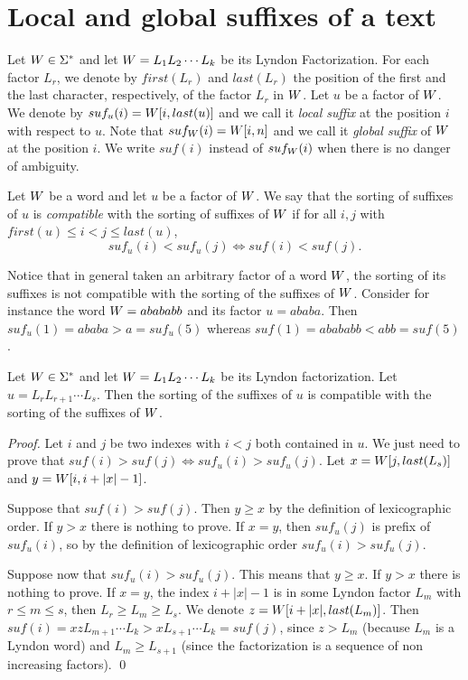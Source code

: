 \documentclass[envcountsame,runningheads]{llncs}
\begin{document}
\section{Local and global suffixes of a text}\label{sec:method}

Let $W \in \Sigma^*$ and let $W =L_1L_2 \cdots L_k$ be its Lyndon Factorization.
For each factor $L_r$, we denote by $first(L_r)$ and $last(L_r)$ the position of the first and the last character, respectively, of the factor $L_r$ in $W$. Let $u$ be a factor of $W$. We denote by $suf_u(i) = W[i, last(u)]$ and we call it \emph{local suffix} at the position $i$ with respect to $u$. Note that $suf_W(i) = W[i, n]$ and we call it \emph{global suffix} of $W$ at the position $i$. We write $suf(i)$ instead of $suf_W(i)$ when there is no danger of ambiguity.

\begin{definition}
Let $W$ be a word and let $u$ be a factor of $W$. We say that the sorting of suffixes of $u$ is \emph{compatible} with the sorting of suffixes of $W$ if for all $i,j$ with $first(u) \leq i < j \leq last(u)$,
$$suf_u(i) < suf_u(j) \iff suf(i) < suf(j).$$
\end{definition}

Notice that in general taken an arbitrary factor of a word $W$, the sorting of its suffixes is not compatible with the sorting of the suffixes of $W$. Consider for instance the word $W=abababb$ and its factor $u=ababa$. Then $suf_u(1)=ababa>a=suf_u(5)$ whereas $suf(1)=abababb<abb=suf(5)$.

\begin{theorem}\label{th:SufOrder}
Let $W\in \Sigma^*$ and let $W=L_1L_2 \cdots L_k$ be its Lyndon factorization.
Let $u=L_r L_{r+1}\cdots L_s$.
Then the sorting of the suffixes of $u$ is compatible with the sorting of the suffixes of $W$.
\end{theorem}
\begin{proof}
Let $i$ and $j$ be two indexes with $i<j$ both contained in $u$. We just need to prove that $suf(i)>suf(j) \iff suf_u(i) > suf_u(j)$.
Let $x=W[j, last(L_s)]$ and $y=W[i, i+|x|-1]$.

Suppose that $suf(i)>suf(j)$. Then $y\geq x$ by the definition of lexicographic order. If $y>x$ there is nothing to prove.
If $x=y$, then $suf_u(j)$ is prefix of $suf_u(i)$, so by the definition of lexicographic order $suf_u(i) > suf_u(j)$.


Suppose now that $suf_u(i) > suf_u(j)$. This means that $y\geq x$. If $y>x$ there is nothing to prove. If $x=y$, the index $i+|x|-1$ is in some Lyndon factor $L_m$ with $r \leq m \leq s$, then $L_r\geq L_m\geq L_s$. We denote  $z = W[i+|x|, last(L_m)]$. Then  $suf(i)=xzL_{m+1}\cdots L_k>xL_{s+1}\cdots L_k=suf(j)$, since $z>L_m$ (because $L_m$ is a Lyndon word) and $L_m\geq L_{s+1}$ (since the factorization is a sequence of non increasing factors). \qed
\end{proof}
\end{document}
